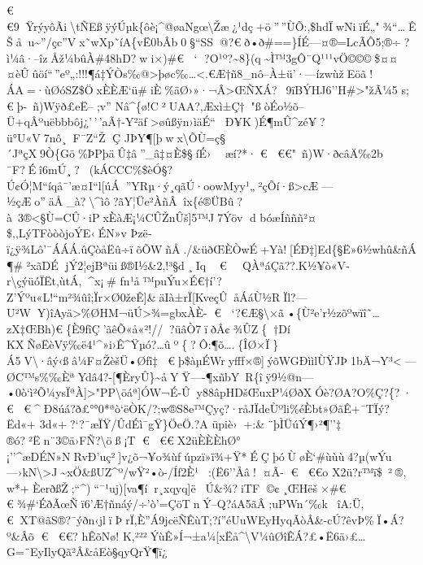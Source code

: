 €€9ŸrýyôÃi\textbackslash tÑEßÿýÚµk\{ôè¡\^{}@øaNgœ\textbackslash Žæ¿¹dç+ö''\,''ÙÕ:,\$hdÏwNiïÉ„"¾``\ldotsÊŠåu\textasciitilde''\textbar/çc''Vx˜wXp˜íA\{vË0bÂb0§``SS@ ?€ð•ð\#==\}ÍÉ---¤®=LcÃÔ5;®÷?ì¼â·--îzÅž¼bûÀ\#48hD?wi×)\#€ 
`
?O¹º?\textasciitilde8\}(q\textasciitilde Ì™3gÔ¨Q¹¹¹vÖ©©©\$¤¤¤èÛûöí``\,''eº„:!!!¶á‡ÝÒs‰@\textgreater þøc‰\ldots\textless.€Æ†ñ8\_nô--À±ü'·---ízwùžEöã!ÁA=·ùØóSZ\$ÖxÈÈÆ`ü\#iÈ\%äØ›»·¬Â\textgreater ŒÑXÁ?~9ïBÝHJ6''H\#\textgreater"žÃ¼5
s; € þ-~ñ)Wÿð£eË--;v''
Nâ\^{}\{ø!C²UAA?,Æxì±Ç†"ßòÉ\textquotesingle o½õ--Ü+qÂºuëbbbôj¿'\,'\,'aÃ†-Y²äƒ\textgreater øûßÿn›ìäÉ``Ð¥K)É¶mÛ\^{}zé¥?ü°U«V7nô¸ F¯Z``Ž
Ç JÞY¶{[}þwx\textbackslash Õ­Ù=ç§´JªçX9Ò\{Gö\%ÞPþäÛ‡â''\_â‡¤È\$§íÉ› 
æí?*· €  €€"~ñ)W·ðcâÄ‰2b
¯F?Éî6mÚ¸?(kÁCCC\%\$èÓ§?Ú¢Ó¦M``íqå¯'æ¤I``l{[}úÁ''YRµ·ý¸qãÚ·oowMyy¹„²çÕí·ß\textgreater cÆ---½çÆo''äÅ\_\textbar à?\textbackslash\^{}ìô?ãY¦Üe²ÀñÂîx\{é®ÜBû?à~3®\textless§Ù=CÛ·iPxÈàÆ¡¼CÛŽnÛš{]}5™J7Ýöv
d bóæÍñññ²¤\$,,LýTF\textquotesingle òòòjoÝE‹ÉN»v
Þzë­ï¿ÿ¾Lô'¯ÁÁÁ.ûÇòåËû÷ïõÕWñÅ./\&üðŒÈÒwÉ+Yà!{[}ÉÐ‡{]}Ed\{§Ë»6½whû\&ñÁ¶\#²xãDÉ
jÝ2¦ejBªüiß®I½\&2‚!³§d¸Iq € 
~QÀªáÇã??.K½¥ò«V­r\textbackslash çýüóÏËt,ùtÁ‚\^{}x¡\#
fn¹å™puÝu×É€†í'?Z'Ýºu«L!{}``m²¾ûî;Ïr×Ø0žeÊ{]}\&äIà±rÏ{[}KveçÛåÁáÙ½RÏl?---U²WY)îAyä \textgreater\%ØHM¬üÚ\textgreater¾=gbxÀÈ-
€ 
`?€Æ§\textbackslash×ã •\{Ù²e'r½zõºwïî˜\ldots zX‡ŒBh)€\{È9ƒîÇ'ãêÕ«å«²!//?üâÒ7ïðÂ¢¾ÛZ\{†Dí
KXÑøËèVÿ‰ë4¹\^{}»i›Ê\^{}Ÿµó?\ldots ûº\{?Ô:¶õ\ldots­.\{ÎØ×Ï\}Á5V\textbackslash·âý‹ßâ¼\textquotesingle F¤ŽèšÜ•Øƒî‡ 
€ þ\$àµÉWryfff×®{]}ýõWGÐììlÙŸJÞ1bÄ¬Y³\textless---ØC™s\%‰ÈªYdâ4?-{[}¶ÈryÛ\}\textasciitilde åYŸ----¶xñbY~R\{îÿ9½@n---•0ò`ì²Õ¼ysÏªÀ{]}\textgreater"PP\textbackslash öáª{]}ÓW¬É-Ûy88âpHDšŒuxP¼ØðXÓè?ØA?O\%Ç?\{?·
€  € \^{}Ð8úá?ð£°°0*ªò`ëÒK/?;w®S8e™Çyç?·råJÏdeÙºli\%éÈbt»ØãÊ+¯TÏý?Ëd«+
3d«+?{}`?¯æÏŸ/ÛdÉì¯gŸ\}ÖeÖ.?A üpiè›+:\&¨þÌÜúÝ¶›²¶''‡
®ó?²Ë­n¨3©ä›FÑ?\textbackslash öß¡T € 
€€X2üÈÈÈhØ°¡''\^{}æDÉN»NRvÐ'uç²{]}v¿õ¬¥o¾ùfúpzï»ï¾+Ÿ*ÉÇþóÙøÈ`\#ùùù4?µ(wÝu---›kN\textbackslash\textgreater J\textasciitilde xÖ\textbar\&ßUZ\^{}º/wŸ²\textquotesingle•ò\textquotesingle-/Íƒ2È¹:(Ë6''Åâ!¤Ã-
€  €€o X2ü?\textquotesingle r™ï\$~²®,
w*+ÈerðßŽ;\textbar``\^{})``¯\textbar¹uj){[}va¶ír¸xqyq{]}ëÚ\&¾?iTF
©¢¸ŒHëš×\#€ 
€ ¾\#`ÉðÃœÑï6'Æ†ñnáý/÷'ò'=ÇöTnÝ--Q?áA5ãÂ;\textquotesingle uPWn´‰kîA:Ü‚ 
€ XT@ãS®?¯ýðn‹jlïÞrÏ,È''Á9jcëÑÊùT;?í''éUu­WEyHyqÃòÂ\&-cÚ?êvÞ\%Ï•Á?º\&Âõ € 
€€? h\textbar ÊõNø!
K,²²²ÝùÊ»Í¬±a¼{[}xËå\^{}\textbackslash V¼ûØîÊÁ?£•Ë6ä›£\ldots G=¨EyIlyQã²Â\&åEò§qyQrŸ¶ï¿
